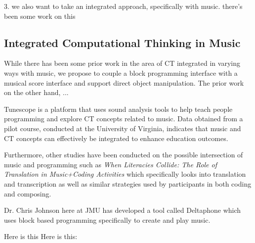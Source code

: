 \documentclass[manuscript,screen,review]{acmart}
\begin{document}

3. we also want to take an integrated approach, specifically with music. there's been some work on this

\subsection{Integrated Computational Thinking in Music}

While there has been some prior work in the area of CT integrated in varying ways with music, we propose to couple a block programming interface with a musical score interface and support direct object manipulation.
The prior work on the other hand, ...



Tunescope \cite{tunescope} is a platform that uses sound analysis tools to help teach people programming and explore CT concepts related to music. Data obtained from a pilot course, conducted at the University of Virginia, indicates that music and CT concepts can effectively be integrated to enhance education outcomes. 

Furthermore, other studies have been conducted on the possible intersection of music and programming such as \textit{When Literacies Collide: The Role of Translation in Music+Coding Activities} \cite{earsketch} which specifically looks into translation and transcription as well as similar strategies used by participants in both coding and composing. 

Dr. Chris Johnson here at JMU has developed a tool called Deltaphone \cite{johnson_deltaphone_nodate} which uses block based programming specifically to create and play music. 

Here is this \cite{Tunepad}
Here is this: \cite{Earsketch/Tunepad}
\end{document}
